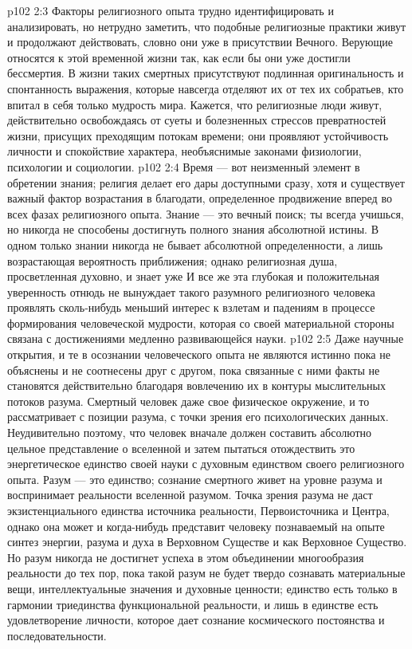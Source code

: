 \vs p102 2:3 Факторы религиозного опыта трудно идентифицировать и анализировать, но нетрудно заметить, что подобные религиозные практики живут и продолжают действовать, словно они уже в присутствии Вечного. Верующие относятся к этой временной жизни так, как если бы они уже достигли бессмертия. В жизни таких смертных присутствуют подлинная оригинальность и спонтанность выражения, которые навсегда отделяют их от тех их собратьев, кто впитал в себя только мудрость мира. Кажется, что религиозные люди живут, действительно освобождаясь от суеты и болезненных стрессов превратностей жизни, присущих преходящим потокам времени; они проявляют устойчивость личности и спокойствие характера, необъяснимые законами физиологии, психологии и социологии.
\vs p102 2:4 \pc Время --- вот неизменный элемент в обретении знания; религия делает его дары доступными сразу, хотя и существует важный фактор возрастания в благодати, определенное продвижение вперед во всех фазах религиозного опыта. Знание --- это вечный поиск; ты всегда учишься, но никогда не способены достигнуть полного знания абсолютной истины. В одном только знании никогда не бывает абсолютной определенности, а лишь возрастающая вероятность приближения; однако религиозная душа, просветленная духовно,  и знает уже  И все же эта глубокая и положительная уверенность отнюдь не вынуждает такого разумного религиозного человека проявлять сколь\hyp{}нибудь меньший интерес к взлетам и падениям в процессе формирования человеческой мудрости, которая со своей материальной стороны связана с достижениями медленно развивающейся науки.
\vs p102 2:5 Даже научные открытия, и те в осознании человеческого опыта не являются истинно  пока не объяснены и не соотнесены друг с другом, пока связанные с ними факты не становятся действительно  благодаря вовлечению их в контуры мыслительных потоков разума. Смертный человек даже свое физическое окружение, и то рассматривает с позиции разума, с точки зрения его психологических данных. Неудивительно поэтому, что человек вначале должен составить абсолютно цельное представление о вселенной и затем пытаться отождествить это энергетическое единство своей науки с духовным единством своего религиозного опыта. Разум --- это единство; сознание смертного живет на уровне разума и воспринимает реальности вселенной разумом. Точка зрения разума не даст экзистенциального единства источника реальности, Первоисточника и Центра, однако она может и когда\hyp{}нибудь представит человеку познаваемый на опыте синтез энергии, разума и духа в Верховном Существе и как Верховное Существо. Но разум никогда не достигнет успеха в этом объединении многообразия реальности до тех пор, пока такой разум не будет твердо сознавать материальные вещи, интеллектуальные значения и духовные ценности; единство есть только в гармонии триединства функциональной реальности, и лишь в единстве есть удовлетворение личности, которое дает сознание космического постоянства и последовательности.
